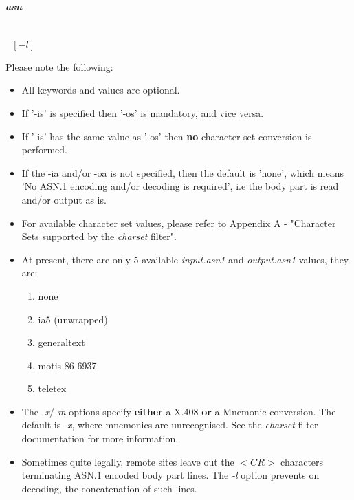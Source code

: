 \begin {tabbing}

{\bf {\em asn}} \\
\ \ \ \ \=
\= \begin{math} [-ia \ \ "none"\  |\  input.asn1] \end{math}\ \ \ \ 
\= \begin{math} [-oa \ \ "none"\  |\  output.asn1] \end{math} \\

\> \begin{math} [-is \ \ input.character.set] \end{math}
\>\>  \begin{math} [-os \ \ output.character.set] \end{math} \\

\> \begin{math} [ -x \  | \  -m ] \ \ \ [ -l ] \end{math}
\end{tabbing}

\smallskip
\noindent Please note the following: 
\begin {itemize}
\item All keywords and values are optional.
\item If '-is' is specified then '-os' is mandatory, and vice versa.
\item If '-is' has the same value as '-os' 
then {\bf no} character set conversion is performed.
\item If the -ia and/or -oa is not specified, then the default is 
'none', which means 'No ASN.1 encoding and/or decoding is required', 
i.e  the body part is read and/or output as is. 
\item For available character set values, please refer to 
Appendix A - "Character Sets supported by the {\em charset} filter".
\clearpage
\item At present, there are only 5 available {\em input.asn1} and
{\em output.asn1} values, they are:
\begin{enumerate}
\item none
\item ia5 (unwrapped)
\item generaltext
\item motis-86-6937
\item teletex
\end{enumerate}
\item The {\em -x}/{\em -m} options specify {\bf either} a X.408
{\bf or} a Mnemonic conversion.  The default is {\em -x},
where mnemonics are unrecognised. See the {\em charset} filter documentation
for more information.
\item Sometimes quite legally, remote sites leave out the \begin{math} <CR>
\end{math} characters terminating ASN.1 encoded body part lines.
The {\em -l} option prevents on decoding, the concatenation of such lines.
\end {itemize}
\bigskip

